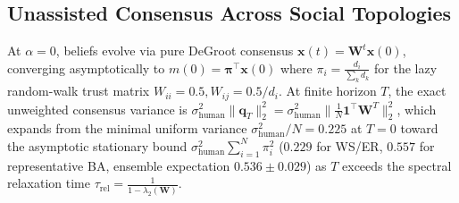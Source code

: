 \documentclass
[letterpaper]{article}
\begin{document}
\subsection{Unassisted Consensus Across Social Topologies}
At $\alpha = 0$, beliefs evolve via pure DeGroot consensus $\mathbf{x}(t) = \mathbf{W}^t \mathbf{x}(0)$, converging asymptotically to $m(0) = \boldsymbol{\pi}^\top \mathbf{x}(0)$ where $\pi_i = \frac{d_i}{\sum_k d_k}$ for the lazy random-walk trust matrix $W_{ii} = 0.5, W_{ij} = 0.5/d_i$. At finite horizon $T$, the exact unweighted consensus variance is $\sigma_{\text{human}}^2 \|\mathbf{q}_T\|_2^2 = \sigma_{\text{human}}^2 \|\frac{1}{N}\mathbf{1}^\top \mathbf{W}^T\|_2^2$, which expands from the minimal uniform variance $\sigma_{\text{human}}^2/N = 0.225$ at $T=0$ toward the asymptotic stationary bound $\sigma_{\text{human}}^2 \sum_{i=1}^N \pi_i^2$ ($0.229$ for WS/ER, $0.557$ for representative BA, ensemble expectation $0.536 \pm 0.029$) as $T$ exceeds the spectral relaxation time $\tau_{\text{rel}} = \frac{1}{1 - \lambda_2(\mathbf{W})}$.
\end{document}
